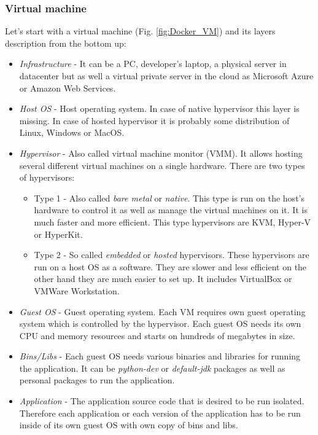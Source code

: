 \subsubsection{Virtual machine}
Let's start with a virtual machine (Fig. \ref{fig:Docker_VM}) and its layers description from the bottom up:
\begin{itemize}
\item \textit{Infrastructure} - It can be a PC, developer's laptop, a
  physical server in datacenter but as well a virtual private server
  in the cloud as Microsoft Azure or Amazon Web Services.
\item \textit{Host OS} - Host operating system. In case of native
  hypervisor this layer is missing. In case of hosted hypervisor it is
  probably some distribution of Linux, Windows or MacOS.
\item \textit{Hypervisor} - Also called virtual machine monitor (VMM). It allows hosting several different virtual machines
on a single hardware. There are two types of hypervisors:
\begin{itemize}
\item Type 1 -  Also called \textit{bare metal} or \textit{native}. This type is run on the host's hardware to control it as well as manage 
the virtual machines on it. It is much faster and more efficient. This type hypervisors are KVM, Hyper-V or HyperKit.
\item Type 2 - So called \textit{embedded} or \textit{hosted} hypervisors. These hypervisors are run on a host OS as a software. They are slower
and less efficient on the other hand they are much easier to set up. It includes VirtualBox or VMWare Workstation.
\end{itemize}
\item \textit{Guest OS} - Guest operating system. Each VM requires own guest operating system which is controlled by the hypervisor. Each 
guest OS needs its own CPU and memory resources and starts on hundreds of megabytes in size.
\item \textit{Bins/Libs} - Each guest OS needs various binaries and libraries for running the application. It can be \textit{python-dev} or \textit{default-jdk} packages as well as personal packages to run the application.
\item \textit{Application} - The application source code that is desired to be run isolated. Therefore each application or each version of the application has to be run inside of its own guest OS with own copy of bins and libs. 
\end{itemize}

